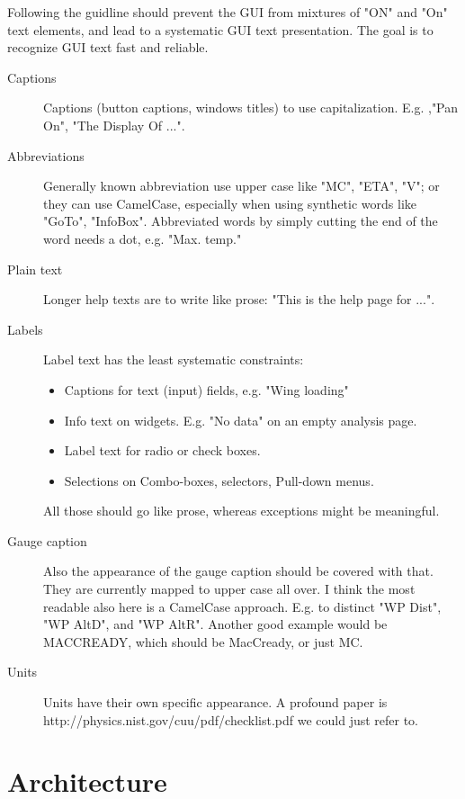 \documentclass[a4paper,12pt]{refrep}
\begin{document}
Following the guidline should prevent the GUI from mixtures of "ON" and 
"On" text elements, and lead to a systematic GUI text presentation. 
The goal is to recognize GUI text fast and reliable.

\begin{description}
  \item[Captions] Captions (button captions, windows titles) to use
        capitalization. E.g. ,"Pan On", "The Display Of ...". 

  \item[Abbreviations] Generally known abbreviation use upper case like "MC", "ETA",
        "V"; or they can use CamelCase, especially when using synthetic
        words  like "GoTo", "InfoBox". 
        Abbreviated words by simply cutting the end of the word needs a
        dot, e.g. "Max. temp."

  \item[Plain text] Longer help texts are to write like prose: "This is the help
        page for ...".

  \item[Labels] Label text has the least systematic constraints:
\begin{itemize}
    \item Captions for text (input) fields, e.g. "Wing loading"
    \item Info text on widgets. E.g. "No data" on an empty
          analysis page. 
    \item Label text for radio or check boxes. 
    \item Selections on Combo-boxes, selectors, Pull-down menus. 
\end{itemize}
  All those should go like prose, whereas exceptions might be
  meaningful.
  
  \item[Gauge caption] Also the appearance of the gauge caption should be covered with
        that. They are currently mapped to upper case all over. I think
        the most readable also here is a CamelCase approach. E.g. to
        distinct "WP Dist", "WP AltD", and "WP AltR". Another good
        example would be MACCREADY, which should be MacCready, or just
        MC.

  \item[Units] Units have their own specific appearance. A profound paper is
        http://physics.nist.gov/cuu/pdf/checklist.pdf we could just
        refer to.
\end{description}


\chapter{Architecture}
\end{document}
